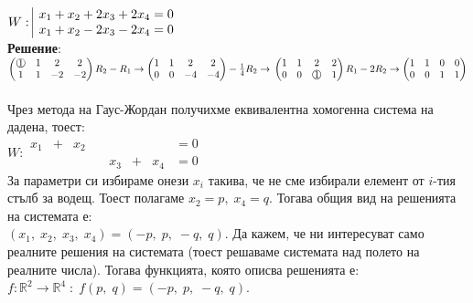 \documentclass[12pt]{article}
\newcommand{\R}{\mathbb{R}}
\newcommand*{\mcirc}[1]{\text{\raisebox{.5pt}{\textcircled{\raisebox{-.9pt} {#1}}}}}
\begin{document}
$W : \begin{array}{|l@{}}
    x_1 + x_2 + 2x_3 + 2x_4 = 0 \\
    x_1 + x_2 - 2x_3 - 2x_4 = 0
\end{array}$ \\

\textbf{Решение}: \\

$\begin{pmatrix}
    \mcirc{1} & 1 &  2 &  2 \\
    1 & 1 & -2 & -2
\end{pmatrix} R_2 - R_1 \to \begin{pmatrix}
    1 & 1 &  2 &  2 \\
    0 & 0 & -4 & -4
\end{pmatrix} -\frac{1}{4}R_2 \to \\\\\\
\begin{pmatrix}
    1 & 1 & 2 & 2 \\
    0 & 0 & \mcirc{1} & 1
\end{pmatrix} R_1 - 2R_2 \to \begin{pmatrix}
    1 & 1 & 0 & 0 \\
    0 & 0 & 1 & 1
\end{pmatrix} $ \\\\

Чрез метода на Гаус-Жордан получихме еквивалентна хомогенна система на дадена, тоест: \\

$W : \begin{array}{|lccccccr}
    x_1 & + & x_2 & ~ & ~   & ~ & ~   & = 0 \\
    ~   & ~ & ~   & ~ & x_3 & + & x_4 & = 0
\end{array}$ \\

За параметри си избираме онези $x_i$ такива, че не сме избирали елемент от $i$-тия стълб за водещ.
Тоест полагаме $x_2 = p, \; x_4 = q$. Тогава общия вид на решенията на системата е: \\

$(x_1, \; x_2, \; x_3, \; x_4) = (-p, \; p, \; -q, \; q)$.
Да кажем, че ни интересуват само реалните решения на системата (тоест решаваме системата над полето на реалните числа).
Тогава функцията, която описва решенията е: $f : \R^2 \to \R^4 \; : \; f(p, \; q) = (-p, \; p, \; -q, \; q)$. \\
\end{document}
